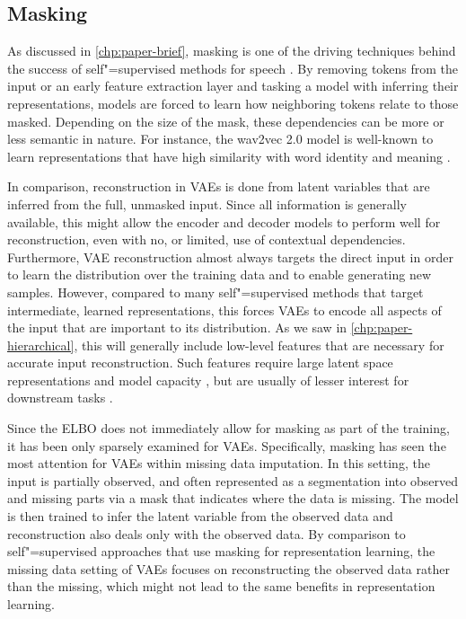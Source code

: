 \subsection{Masking} 
As discussed in \cref{chp:paper-brief}, masking is one of the driving techniques behind the success of self"=supervised methods for speech \parencite{devlin_bert_2018,baevski_wav2vec_2020}. By removing tokens from the input or an early feature extraction layer and tasking a model with inferring their representations, models are forced to learn how neighboring tokens relate to those masked. Depending on the size of the mask, these dependencies can be more or less semantic in nature. For instance, the wav2vec 2.0 model is well-known to learn representations that have high similarity with word identity and meaning \parencite{pasad_layerwise_2021}. 

In comparison, reconstruction in VAEs is done from latent variables that are inferred from the full, unmasked input. Since all information is generally available, this might allow the encoder and decoder models to perform well for reconstruction, even with no, or limited, use of contextual dependencies. Furthermore, VAE reconstruction almost always targets the direct input in order to learn the distribution over the training data and to enable generating new samples. However, compared to many self"=supervised methods that target intermediate, learned representations, this forces VAEs to encode all aspects of the input that are important to its distribution. As we saw in \cref{chp:paper-hierarchical}, this will generally include low-level features that are necessary for accurate input reconstruction. Such features require large latent space representations and model capacity \parencite{vahdat_nvae_2020,child_very_2021}, but are usually of lesser interest for downstream tasks \parencite{baevski_wav2vec_2020}.

Since the ELBO does not immediately allow for masking as part of the training, it has been only sparsely examined for VAEs. Specifically, masking has seen the most attention for VAEs within missing data imputation. In this setting, the input is partially observed, and often represented as a segmentation into observed and missing parts via a mask that indicates where the data is missing. The model is then trained to infer the latent variable from the observed data and reconstruction also deals only with the observed data. 
By comparison to self"=supervised approaches that use masking for representation learning, the missing data setting of VAEs focuses on reconstructing the observed data rather than the missing, which might not lead to the same benefits in representation learning. 

